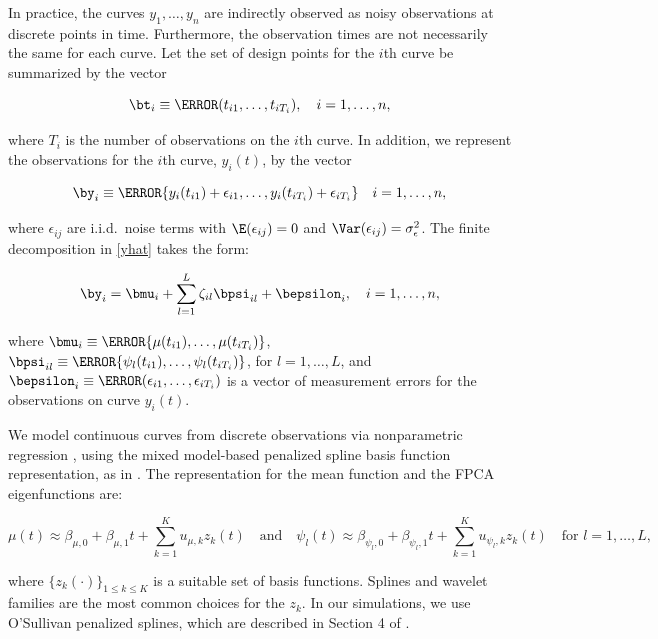 \documentclass[12pt]{article}
\def\sigsqeps{\sigma^2_{\epsilon}}
\theoremstyle{plain}
\theoremstyle{definition}
\theoremstyle{remark}
\begin{document}
In practice, the curves $y_1, \dots, y_n$ are indirectly observed as noisy observations at discrete points in time.
Furthermore, the observation times are not necessarily the same for each curve.
Let the set of design points for the $i$th curve be summarized by the vector

\begin{equation}
	\bt_i \equiv \T{(t_{i1}, \dots, t_{iT_i})}, \quad i = 1, \dots, n,
\label{t_i}
\end{equation}

\noindent where $T_i$ is the number of observations on the $i$th curve. In addition, we represent the
observations for the $i$th curve, $y_i (t)$, by the vector

\begin{equation}
	\by_i \equiv \T{\{ y_i (t_{i1}) + \epsilon_{i1}, \dots, y_i (t_{iT_i}) + \epsilon_{iT_i} \}} \quad i = 1, \dots, n,
\label{disc_obs}
\end{equation}

\noindent where $\epsilon_{ij}$ are i.i.d.\ noise terms with $\E (\epsilon_{ij}) = 0$ and $\Var (\epsilon_{ij}) = \sigsqeps$.
The finite decomposition in \eqref{yhat} takes the form:

\begin{equation}
	\by_i = \bmu_i + \sum_{l=1}^L \zeta_{il} \bpsi_{il} + \bepsilon_{i}, \quad i = 1, \dots, n,
\label{resp_mod}
\end{equation}

\noindent where $\bmu_i \equiv \T{\{ \mu (t_{i1}), \dots, \mu (t_{iT_i}) \}}$,
$\bpsi_{il} \equiv \T{\{ \psi_l (t_{i1}), \dots, \psi_l (t_{iT_i}) \}}$, for $l = 1, \dots, L$, and
$\bepsilon_{i} \equiv \T{(\epsilon_{i1}, \dots, \epsilon_{iT_i})}$ is a vector of measurement errors
for the observations on curve $y_i (t)$.

We model continuous curves from discrete observations via nonparametric regression \cite{ruppert03, ruppert09},
using the mixed model-based penalized spline basis function representation, as in . The
representation for the mean function and the FPCA eigenfunctions are:

\[
	\mu (t) \approx \beta_{\mu, 0} + \beta_{\mu, 1} t + \sum_{k=1}^K u_{\mu, k} z_k (t) \quad
	\text{and} \quad
	\psi_l (t) \approx \beta_{\psi_l, 0} + \beta_{\psi_l, 1} t + \sum_{k=1}^K u_{\psi_l, k} z_k (t) \quad
	\text{for $l = 1, \dots, L$},
\]

\noindent where $\{ z_k (\cdot) \}_{1 \le k \le K}$ is a suitable set of
basis functions. Splines and wavelet families are the most common choices for the $z_k$. In our simulations, we
use O'Sullivan penalized splines, which are described in Section 4 of .
\end{document}
